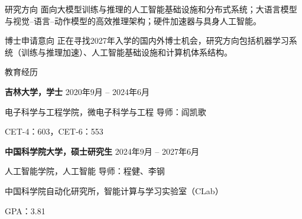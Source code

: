 \documentclass{resume}
\begin{document}
\begin{rSection}{研究方向}
面向大模型训练与推理的人工智能基础设施和分布式系统；大语言模型与视觉--语言--动作模型的高效推理架构；硬件加速器与具身人工智能。
\end{rSection}

\begin{rSection}{博士申请意向}
正在寻找2027年入学的国内外博士机会，研究方向包括机器学习系统（训练与推理加速）、人工智能基础设施和计算机体系结构。
\end{rSection}


\begin{rSection}{教育经历}

\textbf{吉林大学，学士}
\hfill
2020年9月 -- 2024年6月

电子科学与工程学院，微电子科学与工程
\hfill
导师：阎凯歌

CET-4：603，CET-6：553

\vspace{3pt}

\textbf{中国科学院大学，硕士研究生}
\hfill
2024年9月 -- 2027年6月

人工智能学院，人工智能
\hfill
导师：程健、李钢

中国科学院自动化研究所，智能计算与学习实验室（CLab）

GPA：3.81




\end{rSection}

\end{document}
